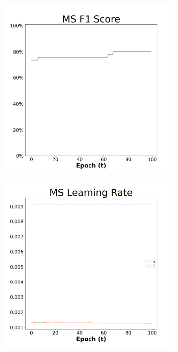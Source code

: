 \begin{figure}[H]
    \centering %
\begin{subfigure}{0.3\textwidth}
  \includegraphics[width=\linewidth]{images/exper2/Ionosphere/MS_0.01_f1.png}
    \includegraphics[width=\linewidth]{images/exper2/Ionosphere/MS_0.01_lr.png}

\end{subfigure}
\end{figure}
